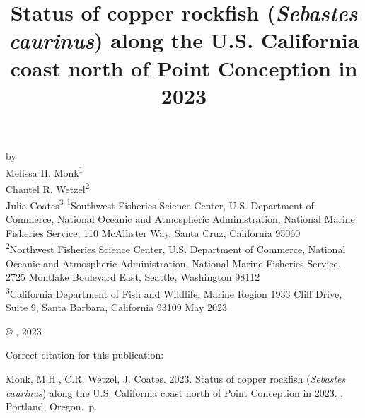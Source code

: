 \documentclass[11pt,
  english,
  letterpaper,
]{article}
\date{}
\newcommand{\trTitle}{Status of copper rockfish (\emph{Sebastes caurinus}) along the U.S. California coast north of Point Conception in 2023}
\newcommand{\trYear}{2023}
\newcommand{\trMonth}{May}
\newcommand{\trAuthsBack}{Monk, M.H., C.R. Wetzel, J. Coates}
\newcommand{\trCitation}{
\begin{hangparas}{1em}{1}
\trAuthsBack{}. \trYear{}. \trTitle{}. \glsentrylong{pfmc}, Portland, Oregon. \pageref{LastPage}{}\,p.
\end{hangparas}}
\newcommand\includegraphicsifexists[2][width=\linewidth]{\IfFileExists{#2}{\texttt{[image: \#2]}}{}}
\begin{document}

\renewcommand*{\thefootnote}{\fnsymbol{footnote}}

\small
\thispagestyle{empty}
\noindent
\begin{center}
\title{Status of copper rockfish (\emph{Sebastes caurinus}) along the U.S. California coast north of Point Conception in 2023}
\vspace{1.5cm}
{\Large\textbf{}}

\includegraphicsifexists[width=4in]{figure_title.png}
\vfill
by\\
Melissa H. Monk\textsuperscript{1}\\
Chantel R. Wetzel\textsuperscript{2}\\
Julia Coates\textsuperscript{3}\vfill
\textsuperscript{1}Southwest Fisheries Science Center, U.S. Department of Commerce, National Oceanic and Atmospheric Administration, National Marine Fisheries Service, 110 McAllister Way, Santa Cruz, California 95060\\
\textsuperscript{2}Northwest Fisheries Science Center, U.S. Department of Commerce, National Oceanic and Atmospheric Administration, National Marine Fisheries Service, 2725 Montlake Boulevard East, Seattle, Washington 98112\\
\textsuperscript{3}California Department of Fish and Wildlife, Marine Region 1933 Cliff Drive, Suite 9, Santa Barbara, California 93109\vfill
\trMonth{} \trYear{}
\end{center}
\clearpage

\thispagestyle{empty}
\vspace*{\fill}
\begin{center}
\copyright{} , \trYear{}\\
\end{center}
\par
\bigskip
\noindent
Correct citation for this publication:
\bigskip
\par
\trCitation{}
\clearpage


\tableofcontents\clearpage
\label{TRlastRoman}
\clearpage
\end{document}
